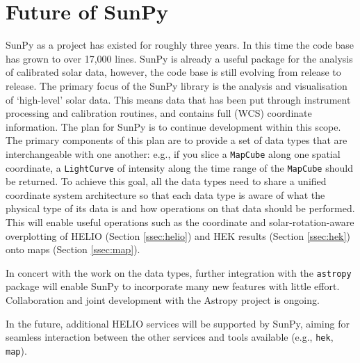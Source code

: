 \section{Future of SunPy}\label{sec:future}

SunPy as a project has existed for roughly three years. In this time 
the code base has grown to over 17,000 lines. SunPy is already a 
useful package for the analysis of calibrated solar data, however, the code 
base is still evolving from release to release.
The primary focus of the 
SunPy library is the analysis and visualisation of `high-level' solar 
data. This means data that has been put through instrument processing 
and 
calibration routines, and contains full (WCS) coordinate information. 
The plan for SunPy is to continue development within this 
scope. The 
primary components of this plan are to provide a set of data types 
that are 
interchangeable with one another: e.g., if you slice a 
\texttt{MapCube} 
along one spatial coordinate, a \texttt{LightCurve} of intensity along the 
time range of 
the \texttt{MapCube} should be returned. To achieve this goal, all the 
data 
types need to share a unified coordinate system architecture so that 
each data 
type is aware of what the physical type of its data is and how 
operations on 
that data should be performed. This will enable useful operations
such as the coordinate and solar-rotation-aware 
overplotting of HELIO (Section \ref{ssec:helio}) and HEK
results (Section \ref{ssec:hek}) onto maps (Section \ref{ssec:map}).

In concert with the work on the data types, further integration with 
the 
\texttt{astropy} package will enable SunPy to incorporate many new features
with little effort. Collaboration and joint development with the 
Astropy project \citep{theastropycollaboration2013} is ongoing.

In the future, additional HELIO services will be supported by SunPy, aiming for
seamless interaction between the other services and tools available (e.g., 
\texttt{hek}, \texttt{map}).  